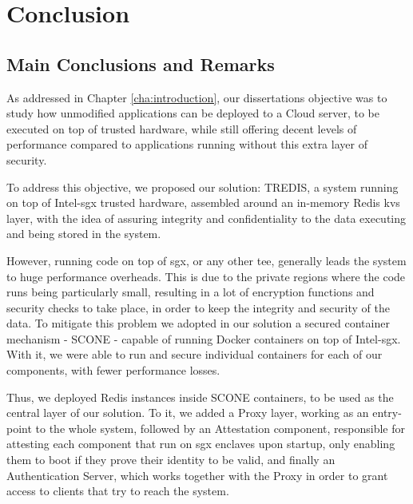 \chapter{Conclusion}
\label{cha:conclusion}

\section{Main Conclusions and Remarks}

As addressed in Chapter \ref{cha:introduction}, our dissertations objective was to study how unmodified applications can be deployed to a Cloud server, to be executed on top of trusted hardware, while still offering decent levels of performance compared to applications running without this extra layer of security.

To address this objective, we proposed our solution: TREDIS, a system running on top of Intel-\gls{sgx} trusted hardware, assembled around an in-memory Redis \gls{kvs} layer, with the idea of assuring integrity and confidentiality to the data executing and being stored in the system.

However, running code on top of \gls{sgx}, or any other \gls{tee}, generally leads the system to huge performance overheads. This is due to the private regions where the code runs being particularly small, resulting in a lot of encryption functions and security checks to take place, in order to keep the integrity and security of the data. To mitigate this problem we adopted in our solution a secured container mechanism - SCONE - capable of running Docker containers on top of Intel-\gls{sgx}. With it, we were able to run and secure individual containers for each of our components, with fewer performance losses.

Thus, we deployed Redis instances inside SCONE containers, to be used as the central layer of our solution. To it, we added a Proxy layer, working as an entry-point to the whole system, followed by an Attestation component, responsible for attesting each component that run on \gls{sgx} enclaves upon startup, only enabling them to boot if they prove their identity to be valid, and finally an Authentication Server, which works together with the Proxy in order to grant access to clients that try to reach the system.

